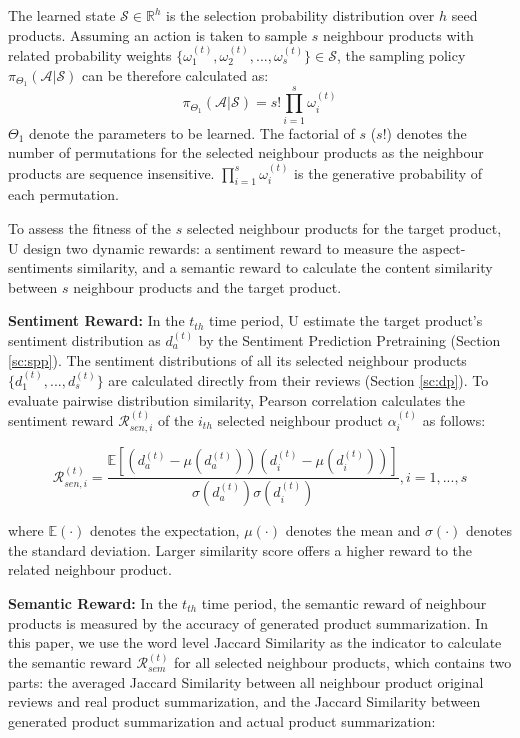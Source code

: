 The learned state $\mathcal{S} \in \mathbb{R}^{h}$ is the selection probability distribution over $h$ seed products. Assuming an action is taken to sample $s$ neighbour products with related probability weights $\{\omega_{1}^{(t)},\omega_{2}^{(t)},...,\omega_{s}^{(t)}\} \in \mathcal{S}$, the sampling policy $\pi_{\Theta_{1}}(\mathcal{A}|\mathcal{S})$ can be therefore calculated as:
\begin{equation}
\pi_{\Theta_{1}}(\mathcal{A}|\mathcal{S}) = s!\prod_{i=1}^{s}\omega^{(t)}_{i}
\end{equation} 
$\Theta_{1}$ denote the parameters to be learned. The factorial of $s$ ($s!$) denotes the number of permutations for the selected neighbour products as the neighbour products are sequence insensitive. $\prod_{i=1}^{s}\omega^{(t)}_{i}$ is the generative probability of each permutation. 

To assess the fitness of the $s$ selected neighbour products for the target product, U design two dynamic rewards: a sentiment reward to measure the aspect-sentiments similarity, and a semantic reward to calculate the content similarity between $s$ neighbour products and the target product.

\textbf{Sentiment Reward:} 
In the $t_{th}$ time period, U estimate the target product's sentiment distribution as $d^{(t)}_{a}$ by the Sentiment Prediction Pretraining (Section \ref{sc:spp}). The sentiment distributions of all its selected neighbour products $\{d^{(t)}_{1},...,d^{(t)}_{s}\}$ are calculated directly from their reviews (Section \ref{sc:dp}). To evaluate pairwise distribution similarity, Pearson correlation calculates the sentiment reward $ \mathcal{R}_{sen,i}^{(t)}$ of the $i_{th}$ selected neighbour product $\alpha_{i}^{(t)}$ as follows:

\begin{equation}
\mathcal{R}_{sen,i}^{(t)} = \frac{\mathbb{E}[(d_{a}^{(t)}-\mu(d_{a}^{(t)}))(d_{i}^{(t)}-\mu(d_{i}^{(t)}))]}{\sigma(d_{a}^{(t)})\sigma(d_{i}^{(t)})}, i = 1,...,s
\end{equation}

where $\mathbb{E}(\cdot)$ denotes the expectation, $\mu(\cdot)$ denotes the mean and $\sigma(\cdot)$ denotes the standard deviation. Larger similarity score offers a higher reward to the related neighbour product.

\textbf{Semantic Reward:} In the $t_{th}$ time period, the semantic reward of neighbour products is measured by the accuracy of generated product summarization. In this paper, we use the word level Jaccard Similarity as the indicator to calculate the semantic reward $\mathcal{R}_{sem}^{(t)}$ for all selected neighbour products, which contains two parts: the averaged Jaccard Similarity between all neighbour product original reviews and real product summarization, and the Jaccard Similarity between generated product summarization and actual product summarization:

